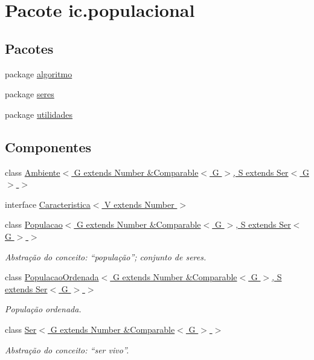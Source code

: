 \hypertarget{namespaceic_1_1populacional}{\section{Pacote ic.\-populacional}
\label{namespaceic_1_1populacional}
}
\subsection*{Pacotes}
\begin{DoxyCompactItemize}
\item 
package \hyperlink{namespaceic_1_1populacional_1_1algoritmo}{algoritmo}
\item 
package \hyperlink{namespaceic_1_1populacional_1_1seres}{seres}
\item 
package \hyperlink{namespaceic_1_1populacional_1_1utilidades}{utilidades}
\end{DoxyCompactItemize}
\subsection*{Componentes}
\begin{DoxyCompactItemize}
\item 
class \hyperlink{classic_1_1populacional_1_1_ambiente_3_01_g_01extends_01_number_01_6_comparable_3_01_g_01_4_00_01a5eb548f12ccc7dbff4cf5c498ddc51}{Ambiente$<$ G extends Number \&\-Comparable$<$ G $>$, S extends Ser$<$ G $>$ $>$}
\item 
interface \hyperlink{interfaceic_1_1populacional_1_1_caracteristica_3_01_v_01extends_01_number_01_4}{Caracteristica$<$ V extends Number $>$}
\item 
class \hyperlink{classic_1_1populacional_1_1_populacao_3_01_g_01extends_01_number_01_6_comparable_3_01_g_01_4_00_506237fa66af7bbd01f529b68d4beaca}{Populacao$<$ G extends Number \&\-Comparable$<$ G $>$, S extends Ser$<$ G $>$ $>$}
\begin{DoxyCompactList}\small\item\em Abstração do conceito\-: “população”; conjunto de seres. \end{DoxyCompactList}\item 
class \hyperlink{classic_1_1populacional_1_1_populacao_ordenada_3_01_g_01extends_01_number_01_6_comparable_3_01_gcbbf91bc78c3435d640426d27f204196}{Populacao\-Ordenada$<$ G extends Number \&\-Comparable$<$ G $>$, S extends Ser$<$ G $>$ $>$}
\begin{DoxyCompactList}\small\item\em População ordenada. \end{DoxyCompactList}\item 
class \hyperlink{classic_1_1populacional_1_1_ser_3_01_g_01extends_01_number_01_6_comparable_3_01_g_01_4_01_4}{Ser$<$ G extends Number \&\-Comparable$<$ G $>$ $>$}
\begin{DoxyCompactList}\small\item\em Abstração do conceito\-: “ser vivo”. \end{DoxyCompactList}\end{DoxyCompactItemize}


